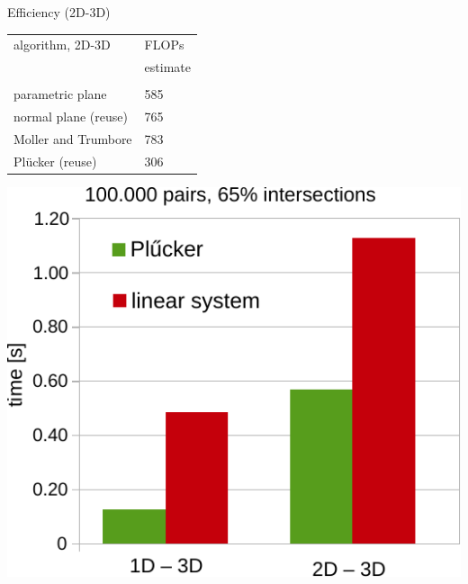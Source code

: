 \documentclass[10pt]{beamer} %
\begin{document}
\begin{frame}{Efficiency (2D-3D)}
    \begin{minipage}{0.45\textwidth}
        \begin{tabular}{l|l}
            algorithm, 2D-3D& FLOPs\\
                      & estimate\\
            \hline\\
            parametric plane & 585\\
            normal plane (reuse) & 765\\
            Moller and Trumbore & 783\\
            Pl\"ucker (reuse) & 306
        \end{tabular}
        \vspace{4em}
    \end{minipage}
    \hspace{2ex}
    \begin{minipage}{0.45\textwidth}
        \begin{center}
            \includegraphics[width=1.2\textwidth]{graphics/intersections_fundamental_speed.pdf}
        \end{center}

    \end{minipage}
\end{frame}
\end{document}
